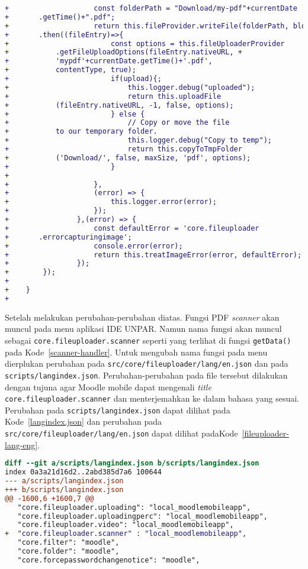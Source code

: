 \begin{lstlisting}[language=diff, frame=single, label ={fileuploader-helper}, caption = Perubahan pada \texttt{src/core/fileuploader/providers/helper.ts} ]
+                    const folderPath = "Download/my-pdf"+currentDate
+		.getTime()+".pdf";
+                    return this.fileProvider.writeFile(folderPath, blob)
+		.then((fileEntry)=>{
+                        const options = this.fileUploaderProvider
+			.getFileUploadOptions(fileEntry.nativeURL, +	
+			'mypdf'+currentDate.getTime()+'.pdf',  
+			contentType, true);
+                        if(upload){;
+                            this.logger.debug("uploaded");
+                            return this.uploadFile
+			(fileEntry.nativeURL, -1, false, options);
+                        } else {
+                            // Copy or move the file 
+			to our temporary folder.
+                            this.logger.debug("Copy to temp");
+                            return this.copyToTmpFolder
+			('Download/', false, maxSize, 'pdf', options);
+                        }
+                    
+                    },
+                    (error) => {
+                        this.logger.error(error);
+                    });
+                },(error) => {
+                    const defaultError = 'core.fileuploader
+		.errorcapturingimage';
+                    console.error(error);
+                    return this.treatImageError(error, defaultError);
+                });
+        });
+    
+    }
+
\end{lstlisting}

Setelah melakukan perubahan-perubahan diatas. Fungsi PDF \textit{scanner} akan muncul pada menu aplikasi IDE UNPAR. Namun nama fungsi akan muncul sebagai \texttt{core.fileuploader.scanner} seperti yang terlihat di fungsi \texttt{getData()} pada \mbox{Kode \ref{scanner-handler}}. Untuk mengubah nama fungsi pada menu dierplukan perubahan pada \texttt{src/core/fileuploader/lang/en.json} dan pada \texttt{scripts/langindex.json}. Perubahan-perubahan pada file tersebut dilakukan dengan tujuna agar Moodle mobile dapat mengenali \textit{title} \texttt{core.fileuploader.scanner} dan menterjemahkan ke dalam bahasa yang sesuai.  Perubahan pada \texttt{scripts/langindex.json} dapat dilihat pada \mbox{Kode \ref{langindex.json}} dan perubahan pada \texttt{src/core/fileuploader/lang/en.json} dapat dilihat pada\mbox{Kode \ref{fileuploader-lang-eng}}.

\begin{lstlisting}[language=diff, frame=single, label ={langindex.json}, caption = Perubahan pada file \texttt{langindex.json} ]
diff --git a/scripts/langindex.json b/scripts/langindex.json
index 0a3a21d16d2..2abd385d7a6 100644
--- a/scripts/langindex.json
+++ b/scripts/langindex.json
@@ -1600,6 +1600,7 @@
   "core.fileuploader.uploading": "local_moodlemobileapp",
   "core.fileuploader.uploadingperc": "local_moodlemobileapp",
   "core.fileuploader.video": "local_moodlemobileapp",
+  "core.fileuploader.scanner" : "local_moodlemobileapp",
   "core.filter": "moodle",
   "core.folder": "moodle",
   "core.forcepasswordchangenotice": "moodle",
\end{lstlisting} 

